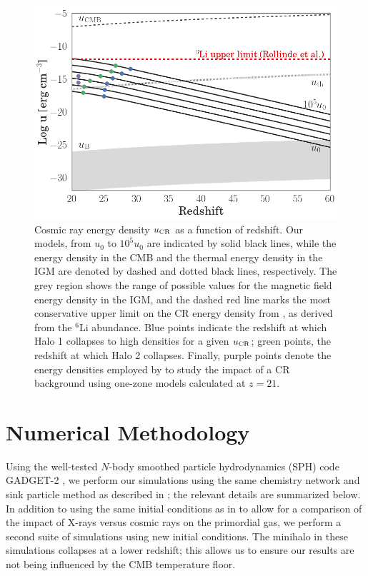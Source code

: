 \documentclass[usenatbib]{mn2e}
\newcommand{\ucr}{{u}_{\rm \small CR}}
\begin{document}
\begin{figure}
\begin{center}
\includegraphics[width=1\columnwidth]{figures/u_cr/u_cr}
\caption{\label{fig:ucr}
Cosmic ray energy density $\ucr$ as a function of redshift.  
Our models, from $u_0$ to $10^5u_0$ are indicated by solid black lines, while the energy density in the CMB and the thermal energy density in the IGM are denoted by dashed and dotted black lines, respectively. 
The grey region shows the range of possible values for the magnetic field energy density in the IGM, and the dashed red line marks the most conservative upper limit on the CR energy density from \citet{RollindeVangioniOlive2006}, as derived from the $^6$Li abundance. 
Blue points indicate the redshift at which Halo 1 collapses to high densities for a given $\ucr$; green points, the redshift at which Halo 2 collapses.  
Finally, purple points denote the energy densities employed by \citet{StacyBromm2007} to study the impact of a CR background using one-zone models calculated at $z=21$.%
}
\end{center}
\end{figure}

\section{Numerical Methodology}
\label{sec:methods}
Using the well-tested $N$-body smoothed particle hydrodynamics (SPH) code GADGET-2 \citep{Springel2005}, we perform our simulations using the same chemistry network and sink particle method as described in \citet{Hummeletal2015}; the relevant details are summarized below.  
In addition to using the same initial conditions as in \citet{Hummeletal2015} to allow for a comparison of the impact of X-rays versus cosmic rays on the primordial gas, we perform a second suite of simulations using new initial conditions.  
The minihalo in these simulations collapses at a lower redshift; this allows us to ensure our results are not being influenced by the CMB temperature floor.
\end{document}

